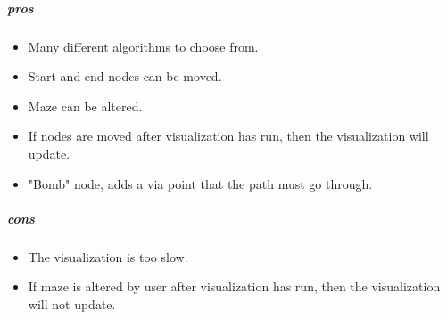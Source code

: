 \documentclass[titlepage]{article}
\begin{document}
\subparagraph*{pros}
\begin{itemize}
    \item Many different algorithms to choose from.
    \item Start and end nodes can be moved.
    \item Maze can be altered.
    \item If nodes are moved after visualization has run, then the visualization will update.
    \item "Bomb" node, adds a via point that the path must go through.
\end{itemize}
\subparagraph*{cons}
\begin{itemize}
    \item The visualization is too slow.
    \item If maze is altered by user after visualization has run, then the visualization will not update.
\end{itemize}
\end{document}
